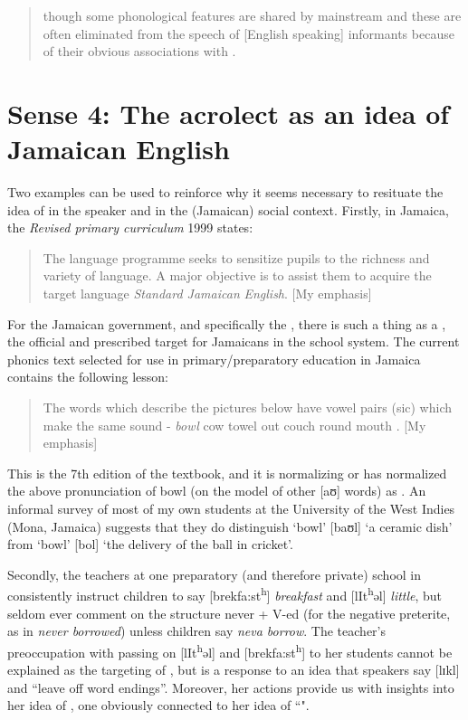 \begin{quote}though some phonological features are shared by mainstream  and  these are often eliminated from the speech of [English speaking] informants because of their obvious associations with .\end{quote} 

\section{Sense 4: The acrolect as an idea of Jamaican English}%

Two examples can be used to reinforce why it seems necessary to resituate the idea of  in the speaker and in the (Jamaican) social context.  Firstly, in Jamaica, the \textit{Revised primary curriculum} 1999 \citep[14]{Curriculum1999} states:

\begin{quote}The language programme seeks to sensitize pupils to the richness and variety of language.  A major objective is to assist them to acquire the target language \textit{Standard Jamaican} \textit{English}. [My emphasis]\end{quote}

For the Jamaican government, and specifically the , there is such a thing as a , the official and prescribed target for Jamaicans in the school system.  The current phonics text selected for use in primary\slash preparatory education in Jamaica contains the following lesson:

\begin{quote}The words which describe the pictures below have vowel pairs (sic) which make the same sound - \textit{bowl}    cow    towel    out    couch    round    mouth \citep[14]{Gbedemah1995}. [My emphasis]\end{quote}

This is the 7th edition of the textbook, and it is normalizing or has normalized the above pronunciation of bowl (on the model of other [aʊ] words) as .  An informal survey of most of my own students at the University of the West Indies (Mona, Jamaica) suggests that they do distinguish ‘bowl’ [baʊl] `a ceramic dish' from ‘bowl’ [bol] `the delivery of the ball in cricket'.

Secondly, the teachers at one preparatory (and therefore private) school in  consistently instruct children to say [brekfa:st\textsuperscript{h}] \textit{breakfast} and [lIt\textsuperscript{h}ǝl] \textit{little}, but seldom ever comment on the structure never + V-ed (for the negative preterite, as in \textit{never borrowed}) unless children say \textit{neva borrow}.  The teacher's preoccupation with passing on [lIt\textsuperscript{h}ǝl] and [brekfa:st\textsuperscript{h}] to her students cannot be explained as the targeting of , but is a response to an idea that  speakers say [lɪkl] and “leave off word endings”.  Moreover, her actions provide us with insights into her idea of , one obviously connected to her idea of ``".  

